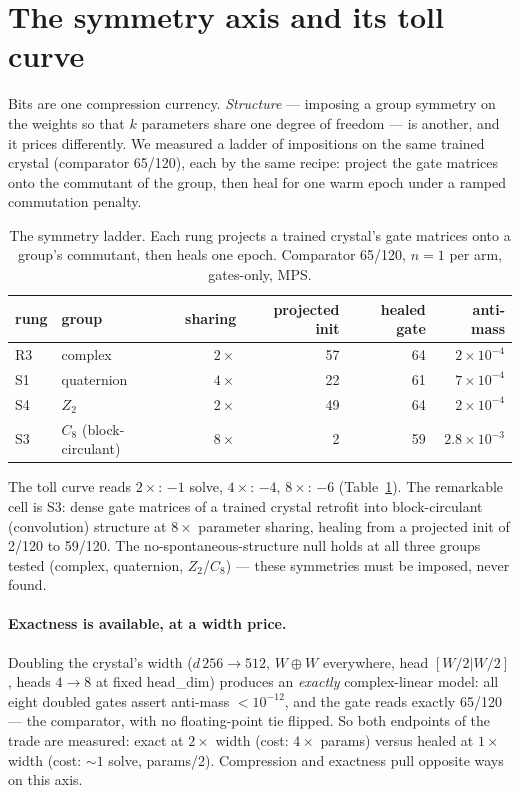 \documentclass[11pt]{article}
\begin{document}
\section{The symmetry axis and its toll curve}
\label{sec:symmetry}

Bits are one compression currency. \emph{Structure} --- imposing a group symmetry
on the weights so that $k$ parameters share one degree of freedom --- is another,
and it prices differently. We measured a ladder of impositions on the same
trained crystal (comparator 65/120), each by the same recipe: project the gate
matrices onto the commutant of the group, then heal for one warm epoch under a
ramped commutation penalty.

\begin{table}[t]
\centering
\caption{The symmetry ladder. Each rung projects a trained crystal's gate
matrices onto a group's commutant, then heals one epoch. Comparator 65/120,
$n{=}1$ per arm, gates-only, MPS.}
\label{tab:ladder}
\begin{tabular}{llrrrr}
\toprule
rung & group & sharing & projected init & healed gate & anti-mass \\
\midrule
R3 & complex     & $2\times$ & 57 & 64 & $2\times10^{-4}$ \\ %
S1 & quaternion  & $4\times$ & 22 & 61 & $7\times10^{-4}$ \\ %
S4 & $Z_2$       & $2\times$ & 49 & 64 & $2\times10^{-4}$ \\ %
S3 & $C_8$ (block-circulant) & $8\times$ & 2 & 59 & $2.8\times10^{-3}$ \\ %
\bottomrule
\end{tabular}
\end{table}

The toll curve reads $2\times$: $-1$ solve, $4\times$: $-4$, $8\times$: $-6$
(Table~\ref{tab:ladder}). The remarkable cell is S3: dense gate matrices of a
trained crystal retrofit into block-circulant (convolution) structure at
$8\times$ parameter sharing, healing from a projected init of 2/120 to 59/120.
The no-spontaneous-structure null holds at all three groups tested (complex,
quaternion, $Z_2$/$C_8$) --- these symmetries must be imposed, never found.

\paragraph{Exactness is available, at a width price.}
Doubling the crystal's width ($d\,256 \to 512$, $W \oplus W$ everywhere, head
$[W/2 | W/2]$, heads $4 \to 8$ at fixed head\_dim) produces an
\emph{exactly} complex-linear model: all eight doubled gates assert anti-mass
$< 10^{-12}$, and the gate reads exactly 65/120 --- the comparator, with no
floating-point tie flipped. %
So both endpoints of the trade are measured: exact at $2\times$ width (cost:
$4\times$ params) versus healed at $1\times$ width (cost: $\sim1$ solve,
params/2). Compression and exactness pull opposite ways on this axis.
\end{document}
